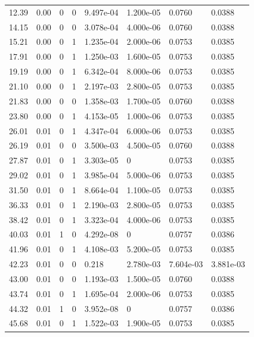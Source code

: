 \documentclass[preview]{standalone}
\begin{document}
{{\begin{tabular}{L{1.2cm}C{1.2cm} C{0.3cm}C{0.5cm} C{1.4cm}C{1.4cm} C{1.4cm}C{1.4cm}}
  12.39  &  0.00  & 0     &  0 &  9.497e-04  & 1.200e-05  & 0.0760 &  0.0388   \\ 
  14.15  &  0.00  & 0     &  0 &  3.078e-04  & 4.000e-06  & 0.0760 &  0.0388   \\ 
  15.21  &  0.00  & 0     &  1 &  1.235e-04  & 2.000e-06  & 0.0753 &  0.0385   \\ 
  17.91  &  0.00  & 0     &  1 &  1.250e-03  & 1.600e-05  & 0.0753 &  0.0385   \\ 
  19.19  &  0.00  & 0     &  1 &  6.342e-04  & 8.000e-06  & 0.0753 &  0.0385   \\ 
  21.10  &  0.00  & 0     &  1 &  2.197e-03  & 2.800e-05  & 0.0753 &  0.0385   \\ 
  21.83  &  0.00  & 0     &  0 &  1.358e-03  & 1.700e-05  & 0.0760 &  0.0388   \\ 
  23.80  &  0.00  & 0     &  1 &  4.153e-05  & 1.000e-06  & 0.0753 &  0.0385   \\ 
  26.01  &  0.01  & 0     &  1 &  4.347e-04  & 6.000e-06  & 0.0753 &  0.0385   \\ 
  26.19  &  0.01  & 0     &  0 &  3.500e-03  & 4.500e-05  & 0.0760 &  0.0388   \\ 
  27.87  &  0.01  & 0     &  1 &  3.303e-05  & 0  & 0.0753 &  0.0385   \\ 
  29.02  &  0.01  & 0     &  1 &  3.985e-04  & 5.000e-06  & 0.0753 &  0.0385   \\ 
  31.50  &  0.01  & 0     &  1 &  8.664e-04  & 1.100e-05  & 0.0753 &  0.0385   \\ 
  36.33  &  0.01  & 0     &  1 &  2.190e-03  & 2.800e-05  & 0.0753 &  0.0385   \\ 
  38.42  &  0.01  & 0     &  1 &  3.323e-04  & 4.000e-06  & 0.0753 &  0.0385   \\ 
  40.03  &  0.01  & 1     &  0 &  4.292e-08  & 0  & 0.0757 &  0.0386   \\ 
  41.96  &  0.01  & 0     &  1 &  4.108e-03  & 5.200e-05  & 0.0753 &  0.0385   \\ 
  42.23  &  0.01  & 0     &  0 &  0.218  & 2.780e-03  & 7.604e-03 &  3.881e-03   \\ 
  43.00  &  0.01  & 0     &  0 &  1.193e-03  & 1.500e-05  & 0.0760 &  0.0388   \\ 
  43.74  &  0.01  & 0     &  1 &  1.695e-04  & 2.000e-06  & 0.0753 &  0.0385   \\ 
  44.32  &  0.01  & 1     &  0 &  3.952e-08  & 0  & 0.0757 &  0.0386   \\ 
  45.68  &  0.01  & 0     &  1 &  1.522e-03  & 1.900e-05  & 0.0753 &  0.0385   \\ 

\end{tabular}}}
\end{document}
